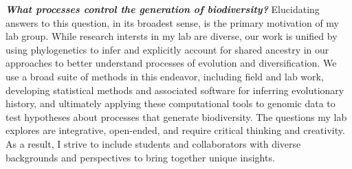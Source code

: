 \textbf{\textit{What processes control the generation of biodiversity?}}
Elucidating answers to this question, in its broadest sense, is the primary
motivation of my lab group.
While research intersts in my lab are diverse, our work is unified by
using
phylogenetics to infer and explicitly account for shared ancestry in our
approaches to better understand processes of evolution and diversification.
We use a broad suite of methods in this endeavor, including
field and lab work,
developing statistical methods and associated software for inferring evolutionary history,
and ultimately applying these computational tools to genomic data to test
hypotheses about processes that generate biodiversity.
The questions my lab explores are integrative, open-ended, and require critical
thinking and creativity.
As a result,
I strive to include students and collaborators with diverse backgrounds and
perspectives to bring together unique insights.

